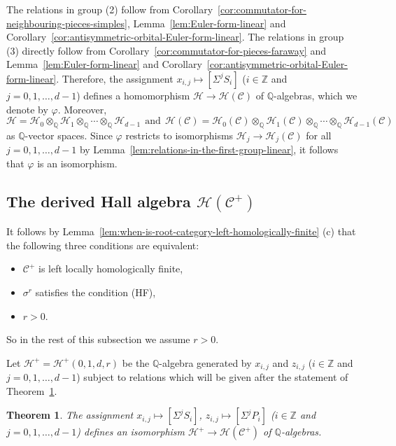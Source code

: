 \documentclass[reqno,12pt,a4paper]{amsart}
\newtheorem{theorem}{Theorem}[section]
\theoremstyle{remark}
\theoremstyle{definition}
\newcommand{\cc}{{\mathcal C}}
\newcommand{\ch}{{\mathcal H}}
\numberwithin{equation}{section}
\begin{document}
The relations in group (2) follow from Corollary~\ref{cor:commutator-for-neighbouring-pieces-simples}, Lemma~\ref{lem:Euler-form-linear} and Corollary~\ref{cor:antisymmetric-orbital-Euler-form-linear}. The relations in group (3) directly follow from Corollary~\ref{cor:commutator-for-pieces-faraway} and Lemma~\ref{lem:Euler-form-linear} and Corollary~\ref{cor:antisymmetric-orbital-Euler-form-linear}.  
Therefore, the assignment $x_{i,j}\mapsto [\Sigma^{j}S_i]$ ($i\in\mathbb{Z}$ and $j=0,1,\ldots,d-1$) defines a homomorphism $\ch\to\ch(\cc)$ of $\mathbb{Q}$-algebras, which we denote by $\varphi$. Moreover, 
\[
\ch=\ch_0\otimes_{\mathbb{Q}}\ch_1\otimes_{\mathbb{Q}}\cdots\otimes_{\mathbb{Q}}\ch_{d-1}
~~\text{and}~~
\ch(\cc)=\ch_0(\cc)\otimes_\mathbb{Q}\ch_1(\cc)\otimes_\mathbb{Q}\cdots\otimes_\mathbb{Q}\ch_{d-1}(\cc)
\]
as $\mathbb{Q}$-vector spaces.  Since $\varphi$ restricts to isomorphisms $\ch_j\to\ch_j(\cc)$ for all $j=0,1,\ldots,d-1$ by Lemma~\ref{lem:relations-in-the-first-group-linear}, it follows that $\varphi$ is an isomorphism. 


\subsection{The derived Hall algebra $\ch(\cc^+)$}
\label{ss:derived-Hall-of-linear-$+$}

It follows by Lemma~\ref{lem:when-is-root-category-left-homologically-finite} (c) that the following three conditions are equivalent:
\begin{itemize}
\item[-] $\cc^+$ is left locally homologically finite,
\item[-] $\sigma^r$ satisfies the condition (HF),
\item[-] $r>0$. 
\end{itemize}
So in the rest of this subsection we assume $r>0$.

Let $\ch^+=\ch^+(0,1,d,r)$ be the $\mathbb{Q}$-algebra generated by $x_{i,j}$ and $z_{i,j}$ ($i\in\mathbb{Z}$ and $j=0,1,\ldots,d-1$) subject to relations which will be given after the statement of Theorem~\ref{thm-for-linear-$+$}.

\begin{theorem}\label{thm-for-linear-$+$}
	The assignment $x_{i,j}\mapsto [\Sigma^{j}S_i]$, $z_{i,j}\mapsto [\Sigma^{j}P_i]$ ($i\in\mathbb{Z}$ and $j=0,1,\ldots,d-1$) defines an isomorphism $\ch^+\to\ch(\cc^+)$ of $\mathbb{Q}$-algebras.
\end{theorem}
\end{document}
